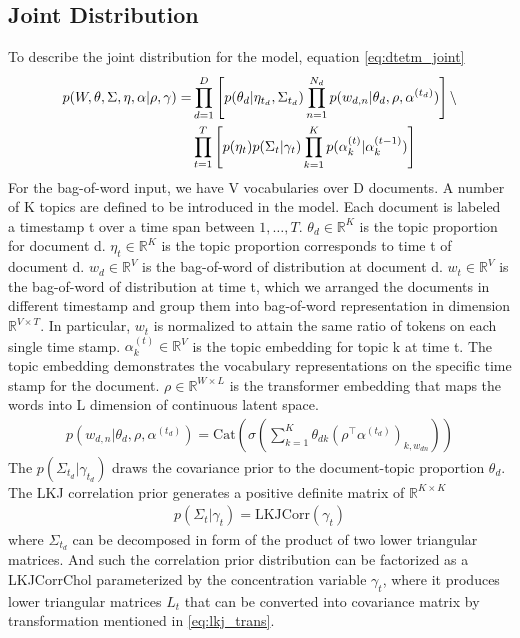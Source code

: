 \subsection{Joint Distribution}
To describe the joint distribution for the model, equation \ref{eq:dtetm_joint}
\begin{align}\label{eq:dtetm_joint}
p(W,\theta,\Sigma,\eta,\alpha|\rho,\gamma)=&\prod_{d=1}^{D}\left[p(\theta_d|\eta_{t_d},\Sigma_{t_d})\prod_{n=1}^{N_d}p(w_{d,n}|\theta_d,\rho,\alpha^{(t_d)})\right]\backslash\notag\\
&\prod_{t=1}^{T}\left[p(\eta_{t})p(\Sigma_{t}|\gamma_t)\prod_{k=1}^{K}p(\alpha_k^{(t)}|\alpha_k^{(t-1)})\right]
\end{align}
For the bag-of-word input, we have V vocabularies over D documents. A number of K topics are defined to be introduced in the model. Each document is labeled a timestamp t over a time span between $ 1,\dots,T $.
$\theta_d\in\mathbb{R}^{K}$ is the topic proportion for document d.
$\eta_{t}\in\mathbb{R}^{K}$ is the topic proportion corresponds to time t of document d.	
$ w_d \in\mathbb{R}^{V}$ is the bag-of-word of distribution at document d.
$ w_t \in\mathbb{R}^{V}$ is the bag-of-word of distribution at time t, which we arranged the documents in different timestamp and group them into bag-of-word representation in dimension $ \mathbb{R}^{V\times T} $. In particular, $ w_t $ is normalized to attain the same ratio of tokens on each single time stamp.
$\alpha_k^{(t)}\in\mathbb{R}^{V}$ is the topic embedding for topic k at time t. The topic embedding demonstrates the vocabulary representations on the specific time stamp for the document.
$ \rho\in\mathbb{R}^{W\times L} $ is the transformer embedding that maps the words into L dimension of continuous latent space. 
\begin{align}
p(w_{d,n}|\theta_d,\rho,\alpha^{(t_d)})=\text{Cat}\left(\sigma\left(\sum_{k=1}^{K}\theta_{dk}(\rho^\top\alpha^{(t_d)})_{k,w_{dn}}\right)\right)
\end{align}
The $ p(\Sigma_{t_d}|\gamma_{t_d}) $ draws the covariance prior to the document-topic proportion $ \theta_d $. The LKJ correlation prior generates a positive definite matrix of $ \mathbb{R}^{K\times K} $
\begin{align}
p(\Sigma_{t}|\gamma_{t})=\text{LKJCorr}(\gamma_{t})
\end{align}
where $\Sigma_{t_d}$ can be decomposed in form of the product of two lower triangular matrices. And such the correlation prior distribution can be factorized as a LKJCorrChol parameterized by the concentration variable $ \gamma_{t} $, where it produces lower triangular matrices $ L_{t} $ that can be converted into covariance matrix by transformation mentioned in \ref{eq:lkj_trans}.
